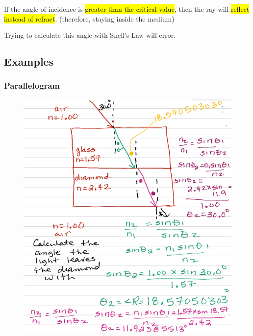\documentclass[a4paper,12pt]{article}
\begin{document}
If the angle of incidence is \hl{greater than the critical value}, then the ray will \hl{reflect instead of refract}. (therefore, staying inside the medium)

Trying to calculate this angle with Snell's Law will error.

\subsection{Examples}
\subsubsection{Parallelogram}
\begin{figure}[H]
    \centering
    \includegraphics[width=\textwidth]{ex-sqr}
\end{figure}
\end{document}
